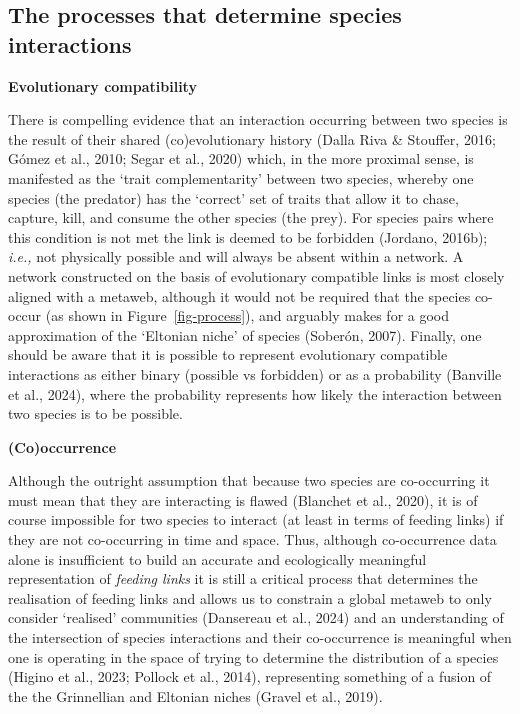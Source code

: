 \documentclass[
]{article}
\begin{document}
\subsection{The processes that determine species
interactions}\label{the-processes-that-determine-species-interactions}

\textbf{Evolutionary compatibility}

There is compelling evidence that an interaction occurring between two
species is the result of their shared (co)evolutionary history (Dalla
Riva \& Stouffer, 2016; Gómez et al., 2010; Segar et al., 2020) which,
in the more proximal sense, is manifested as the `trait complementarity'
between two species, whereby one species (the predator) has the
`correct' set of traits that allow it to chase, capture, kill, and
consume the other species (the prey). For species pairs where this
condition is not met the link is deemed to be forbidden (Jordano,
2016b); \emph{i.e.,} not physically possible and will always be absent
within a network. A network constructed on the basis of evolutionary
compatible links is most closely aligned with a metaweb, although it
would not be required that the species co-occur (as shown in
Figure~\ref{fig-process}), and arguably makes for a good approximation
of the `Eltonian niche' of species (Soberón, 2007). Finally, one should
be aware that it is possible to represent evolutionary compatible
interactions as either binary (possible vs forbidden) or as a
probability (Banville et al., 2024), where the probability represents
how likely the interaction between two species is to be possible.

\textbf{(Co)occurrence}

Although the outright assumption that because two species are
co-occurring it must mean that they are interacting is flawed (Blanchet
et al., 2020), it is of course impossible for two species to interact
(at least in terms of feeding links) if they are not co-occurring in
time and space. Thus, although co-occurrence data alone is insufficient
to build an accurate and ecologically meaningful representation of
\emph{feeding links} it is still a critical process that determines the
realisation of feeding links and allows us to constrain a global metaweb
to only consider `realised' communities (Dansereau et al., 2024) and an
understanding of the intersection of species interactions and their
co-occurrence is meaningful when one is operating in the space of trying
to determine the distribution of a species (Higino et al., 2023; Pollock
et al., 2014), representing something of a fusion of the the Grinnellian
and Eltonian niches (Gravel et al., 2019).
\end{document}

